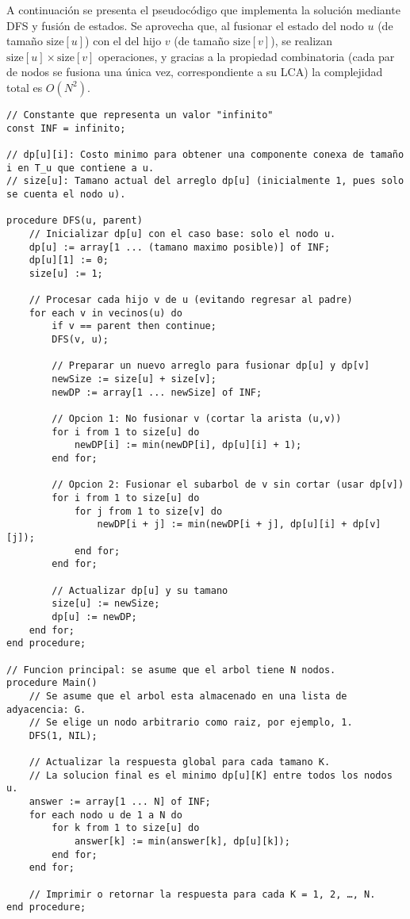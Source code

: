 \documentclass[12pt]{article}
\begin{document}
A continuación se presenta el pseudocódigo que implementa la solución mediante DFS y fusión de estados. Se aprovecha que, al fusionar el estado del nodo \(u\) (de tamaño \(\text{size}[u]\)) con el del hijo \(v\) (de tamaño \(\text{size}[v]\)), se realizan \(\text{size}[u] \times \text{size}[v]\) operaciones, y gracias a la propiedad combinatoria (cada par de nodos se fusiona una única vez, correspondiente a su LCA) la complejidad total es \(O(N^2)\).

\begin{lstlisting}[caption={Pseudocódigo en \(O(N^2)\)}]
// Constante que representa un valor "infinito"
const INF = infinito;  

// dp[u][i]: Costo minimo para obtener una componente conexa de tamaño i en T_u que contiene a u.
// size[u]: Tamano actual del arreglo dp[u] (inicialmente 1, pues solo se cuenta el nodo u).

procedure DFS(u, parent)
    // Inicializar dp[u] con el caso base: solo el nodo u.
    dp[u] := array[1 ... (tamano maximo posible)] of INF;
    dp[u][1] := 0;
    size[u] := 1;

    // Procesar cada hijo v de u (evitando regresar al padre)
    for each v in vecinos(u) do
        if v == parent then continue;
        DFS(v, u);

        // Preparar un nuevo arreglo para fusionar dp[u] y dp[v]
        newSize := size[u] + size[v];
        newDP := array[1 ... newSize] of INF;

        // Opcion 1: No fusionar v (cortar la arista (u,v))
        for i from 1 to size[u] do
            newDP[i] := min(newDP[i], dp[u][i] + 1);
        end for;

        // Opcion 2: Fusionar el subarbol de v sin cortar (usar dp[v])
        for i from 1 to size[u] do
            for j from 1 to size[v] do
                newDP[i + j] := min(newDP[i + j], dp[u][i] + dp[v][j]);
            end for;
        end for;

        // Actualizar dp[u] y su tamano
        size[u] := newSize;
        dp[u] := newDP;
    end for;
end procedure;

// Funcion principal: se asume que el arbol tiene N nodos.
procedure Main()
    // Se asume que el arbol esta almacenado en una lista de adyacencia: G.
    // Se elige un nodo arbitrario como raiz, por ejemplo, 1.
    DFS(1, NIL);

    // Actualizar la respuesta global para cada tamano K.
    // La solucion final es el minimo dp[u][K] entre todos los nodos u.
    answer := array[1 ... N] of INF;
    for each nodo u de 1 a N do
        for k from 1 to size[u] do
            answer[k] := min(answer[k], dp[u][k]);
        end for;
    end for;

    // Imprimir o retornar la respuesta para cada K = 1, 2, …, N.
end procedure;
\end{lstlisting}
\end{document}
